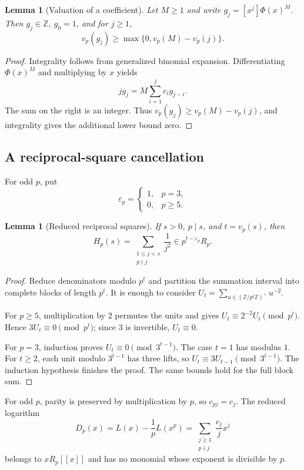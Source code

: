 \documentclass[11pt,a4paper]{article}
\numberwithin{equation}{section}
\newtheorem{lemma}[theorem]{Lemma}
\theoremstyle{definition}
\theoremstyle{remark}
\newcommand{\Z}{\mathbb Z}
\newcommand{\eps}{\varepsilon}
\begin{document}
\begin{lemma}[Valuation of a coefficient]\label{lem:gcoef}
Let $M\ge1$ and write $g_j=[x^j]\Phi(x)^M$. Then $g_j\in\Z$, $g_0=1$,
and for $j\ge1$,
\begin{equation}\label{eq:gvaluation}
 v_p(g_j)\ge\max\{0,v_p(M)-v_p(j)\}.
\end{equation}
\end{lemma}
\begin{proof}
Integrality follows from generalized binomial expansion. Differentiating
$\Phi(x)^M$ and multiplying by $x$ yields
\[
 jg_j=M\sum_{i=1}^j c_i g_{j-i}.
\]
The sum on the right is an integer. Thus $v_p(g_j)\ge v_p(M)-v_p(j)$,
and integrality gives the additional lower bound zero.
\end{proof}

\subsection{A reciprocal-square cancellation}
For odd $p$, put
\[
 \eps_p=\begin{cases}1,&p=3,\\0,&p\ge5.\end{cases}
\]

\begin{lemma}[Reduced reciprocal squares]\label{lem:squares}
If $s>0$, $p\mid s$, and $t=v_p(s)$, then
\begin{equation}\label{eq:Hs}
 H_p(s)=\sum_{\substack{1\le j<s\\p\nmid j}}\frac1{j^2}
 \in p^{t-\eps_p}R_p.
\end{equation}
\end{lemma}
\begin{proof}
Reduce denominators modulo $p^t$ and partition the summation interval into
complete blocks of length $p^t$. It is enough to consider
$U_t=\sum_{u\in(\Z/p^t\Z)^\times}u^{-2}$.

For $p\ge5$, multiplication by $2$ permutes the units and gives
$U_t\equiv 2^{-2}U_t\pmod{p^t}$. Hence $3U_t\equiv0\pmod{p^t}$; since
$3$ is invertible, $U_t\equiv0$.

For $p=3$, induction proves $U_t\equiv0\pmod{3^{t-1}}$. The case $t=1$
has modulus $1$. For $t\ge2$, each unit modulo $3^{t-1}$ has three lifts,
so $U_t\equiv3U_{t-1}\pmod{3^{t-1}}$. The induction hypothesis finishes
the proof. The same bounds hold for the full block sum.
\end{proof}

For odd $p$, parity is preserved by multiplication by $p$, so $c_{pj}=c_j$.
The reduced logarithm
\begin{equation}\label{eq:Dp}
 D_p(x)=L(x)-\frac1pL(x^p)
       =\sum_{\substack{j\ge1\\p\nmid j}}\frac{c_j}{j}x^j
\end{equation}
belongs to $xR_p[[x]]$ and has no monomial whose exponent is divisible by
$p$.
\end{document}
